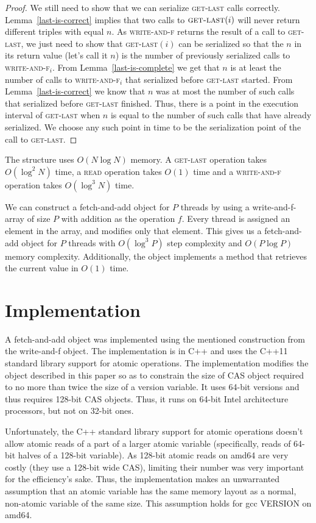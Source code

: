 \documentclass[a4paper,11pt]{article}
\newcommand{\fn}[1]{\textsc{#1}}
\begin{document}
\begin{proof}
	We still need to show that we can serialize \fn{get-last} calls correctly. Lemma~\ref{last-is-correct} implies that two calls to $\fn{get-last}(i)$ will never return different triples with equal $n$. As \fn{write-and-f} returns
	the result of a call to \fn{get-last}, we just need to show that \fn{get-last}$(i)$ can be serialized so that the $n$ in its return value (let's call it $n$) is the number of previously serialized calls to \fn{write-and-f$_i$}. From
	Lemma~\ref{last-is-complete} we get that $n$ is at least the number of calls to \fn{write-and-f$_i$} that serialized before \fn{get-last} started. From Lemma~\ref{last-is-correct} we know that $n$ was at most the number of such calls
	that serialized before \fn{get-last} finished. Thus, there is a point in the execution interval of \fn{get-last} when $n$ is equal to the number of such calls that have already serialized. We choose any such point in time to be the serialization
	point of the call to \fn{get-last}.
\end{proof}

The structure uses $O(N\log{}N)$ memory. A \fn{get-last} operation takes $O(\log^2 N)$ time, a \fn{read} operation takes $O(1)$ time and a \fn{write-and-f} operation takes $O(\log^3 N)$ time.

We can construct a fetch-and-add object for $P$ threads by using a write-and-f-array of size $P$ with addition as the operation $f$. Every thread is assigned an element in the array, and modifies only that element. This gives us
a fetch-and-add object for $P$ threads with $O(\log^3 P)$ step complexity and $O(P\log P)$ memory complexity. Additionally, the object implements a method that retrieves the
current value in $O(1)$ time.

\section{Implementation}
A fetch-and-add object was implemented using the mentioned construction from the write-and-f object. The implementation is in C++ and uses the C++11 standard library support for atomic operations.
The implementation modifies the object described in this paper so as to constrain the size of CAS object required to no more than twice the size of a version variable. It uses 64-bit versions and
thus requires 128-bit CAS objects. Thus, it runs on 64-bit Intel architecture processors, but not on 32-bit ones.

Unfortunately, the C++ standard library support for atomic operations doesn't allow atomic reads of a part of a larger atomic variable (specifically, reads of 64-bit halves of a 128-bit variable).
As 128-bit atomic reads on amd64 are very costly
(they use a 128-bit wide CAS), limiting their number was very important for the efficiency's sake. Thus, the implementation makes an unwarranted assumption that an atomic variable
has the same memory layout as a normal, non-atomic variable of the same size. This assumption holds for gcc VERSION on amd64.
\end{document}
